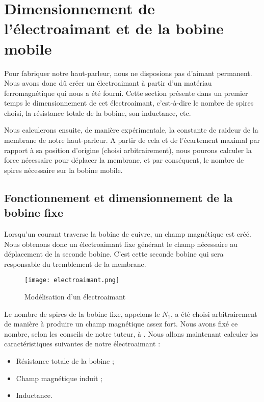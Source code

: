 

\section{Dimensionnement de l'électroaimant et de la bobine mobile}
Pour fabriquer notre haut-parleur, nous ne disposions pas d'aimant permanent. Nous avons donc
dû créer un électroaimant à partir d'un matériau ferromagnétique qui nous a été fourni.
Cette section présente dans un premier temps le dimensionnement de cet électroaimant, c'est-à-dire le
nombre de spires choisi, la résistance totale de la bobine, son inductance, etc.

Nous calculerons ensuite, de manière expérimentale, la constante de raideur de la membrane de
notre haut-parleur. A partir de cela et de l'écartement maximal par rapport à sa position d'origine 
(choisi arbitrairement), 
nous pourons calculer la force nécessaire pour déplacer la membrane, et par conséquent, le nombre
de spires nécessaire sur la bobine mobile.

\subsection{Fonctionnement et dimensionnement de la bobine fixe}
Lorsqu'un courant traverse la bobine de cuivre, un champ magnétique est créé.  Nous obtenons 
donc un électroaimant fixe générant le champ nécessaire au déplacement de la seconde bobine. 
C'est cette seconde bobine qui sera responsable du tremblement de la membrane.

\begin{figure}[ht!]
\centering
\texttt{[image: electroaimant.png]}
\caption{Modélisation d'un électroaimant}
\label{modélisation de l'électroaimant}
\end{figure}

Le nombre de spires de la bobine fixe, appelons-le $N_1$, a été choisi arbitrairement de manière à produire un
champ magnétique assez fort. Nous avons fixé ce nombre, selon les conseils de notre tuteur, à . 
Nous allons maintenant calculer les caractéristiques suivantes de notre électroaimant :

\begin{itemize}
	\item Résistance totale de la bobine ;
	\item Champ magnétique induit ;
	\item Inductance.
\end{itemize}

